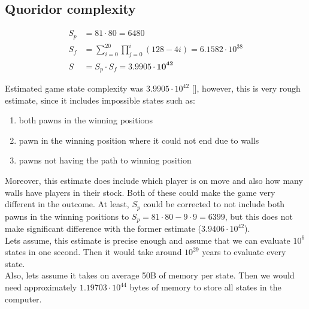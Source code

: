 \documentclass[12pt, oneside]{book}
\begin{document}
  \subsection{Quoridor complexity}
    \begin{figure}
      \vspace*{-1.45cm}
      \begin{equation}
        \label{eqn:mertensestimate}
        \begin{aligned}
          S_p &= 81 \cdot 80 = 6480
          \\
          S_f &= \sum_{i=0}^{20}\prod_{j=0}^{i}(128 - 4i) = 6.1582\cdot10^{38}
          \\
          S &= S_p \cdot S_f = \mathbf{3.9905 \cdot 10 ^{42}}
        \end{aligned}
      \end{equation}
      \vspace*{-2.45cm}
    \end{figure}

    Estimated game state complexity was $3.9905\cdot10^{42}$ [\cite{mertens}],
    however, this is very rough estimate, since it includes impossible states
    such as:
    \begin{enumerate}[topsep=0pt,itemsep=-1ex,partopsep=1ex,parsep=1ex]
      \setlength\itemsep{0em}
      \item both pawns in the winning positions
      \item pawn in the winning position where it could not end due to walls
      \item pawns not having the path to winning position
    \end{enumerate}

    Moreover, this estimate does include which player is on move and also how
    many walls have players in their stock. Both of these could make the game
    very different in the outcome. At least, $S_p$ could be corrected to not
    include both pawns in the winning positions to
    $S_p = 81\cdot80 - 9\cdot9 = 6399$, but this does not make significant
    difference with the former estimate ($3.9406\cdot10^{42}$).\\
    Lets assume, this estimate is precise enough and assume that we can
    evaluate $10^{6}$ states in one second. Then it would take around $10^{29}$
    years to evaluate every state.\\
    Also, lets assume it takes on average 50B of memory per state. Then we
    would need approximately $1.19703\cdot10^{44}$ bytes of memory to store all
    states in the computer.
\end{document}
